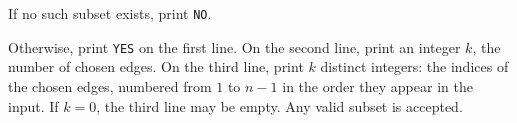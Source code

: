 If no such subset exists, print \texttt{NO}.

Otherwise, print \texttt{YES} on the first line. On the second line, print an
integer $k$, the number of chosen edges. On the third line, print $k$ distinct
integers: the indices of the chosen edges, numbered from $1$ to $n-1$ in the
order they appear in the input. If $k=0$, the third line may be empty. Any
valid subset is accepted.
